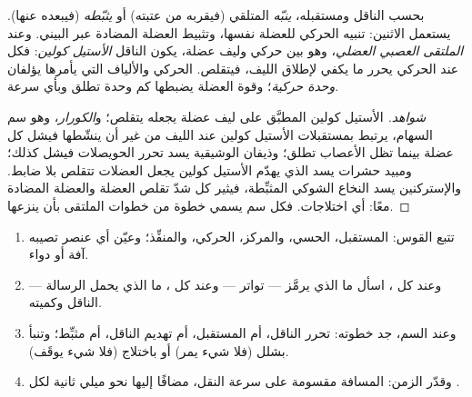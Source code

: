 \begin{proposition}\label{prop:g12:stretch-reflex:junction}
بحسب الناقل ومستقبله، \emph{ينبّه}   المتلقي (فيقربه من
عتبته) أو \emph{يثبّطه} (فيبعده عنها).  يستعمل الاثنين:
تنبيه  الحركي للعضلة نفسها، وتثبيط  العضلة المضادة عبر
 البيني. وعند \emph{الملتقى العصبي العضلي}، وهو  بين 
حركي وليف عضلة، يكون الناقل \emph{الأستيل كولين}: فكل  عند
 الحركي يحرر ما يكفي لإطلاق الليف، فيتقلص.  الحركي
والألياف التي يأمرها يؤلفان \emph{وحدة حركية}؛ وقوة العضلة يضبطها كم
وحدة تطلق وبأي سرعة.
\end{proposition}
\begin{proof}[شواهد]
الأستيل كولين المطبَّق على ليف عضلة يجعله يتقلص؛ و\emph{الكورار}، وهو
سم السهام، يرتبط بمستقبلات الأستيل كولين عند الليف من غير أن ينشّطها
فيشل كل عضلة بينما تظل الأعصاب تطلق؛ وذيفان الوشيقية يسد تحرر
الحويصلات فيشل كذلك؛ ومبيد حشرات يسد  الذي يهدّم الأستيل كولين
يجعل العضلات تتقلص بلا ضابط. والإستركنين يسد  النخاع الشوكي
المثبِّطة، فيثير كل شدّ تقلص العضلة والعضلة المضادة معًا: أي اختلاجات.
فكل سم يسمي خطوة من خطوات الملتقى بأن ينزعها.
\end{proof}

\begin{method}\label{met:g12:stretch-reflex:analyse}
\begin{enumerate}
  \item تتبع القوس: المستقبل،  الحسي، والمركز، 
        الحركي، والمنفِّذ؛ وعيّن أي عنصر تصيبه آفة أو دواء.
  \item وعند كل ، اسأل ما الذي يرمَّز --- تواتر  ---
        وعند كل ، ما الذي يحمل الرسالة --- الناقل وكميته.
  \item وعند السم، جد خطوته: تحرر الناقل، أم المستقبل، أم تهديم
        الناقل، أم  مثبِّط؛ وتنبأ بشلل (فلا شيء يمر) أو باختلاج
        (فلا شيء يوقَف).
  \item وقدّر الزمن: المسافة مقسومة على سرعة النقل، مضافًا إليها نحو
        ميلي ثانية لكل .
\end{enumerate}
\end{method}

